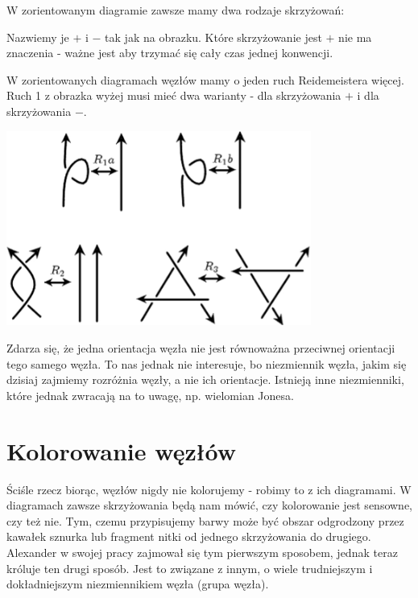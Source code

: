 \documentclass{article}
\begin{document}
W zorientowanym diagramie zawsze mamy dwa rodzaje skrzyżowań:
\begin{center}
\end{center}
Nazwiemy je $+$ i $-$ tak jak na obrazku. Które skrzyżowanie jest $+$ nie ma znaczenia - ważne jest aby trzymać się cały czas jednej konwencji.

W zorientowanych diagramach węzłów mamy o jeden ruch Reidemeistera więcej. Ruch 1 z obrazka wyżej musi mieć dwa warianty - dla skrzyżowania $+$ i dla skrzyżowania $-$.

\begin{center}
  \includegraphics[width=10cm]{oriented_reidemeister.png}
\end{center}

Zdarza się, że jedna orientacja węzła nie jest równoważna przeciwnej orientacji tego samego węzła. To nas jednak nie interesuje, bo niezmiennik węzła, jakim się dzisiaj zajmiemy rozróżnia węzły, a nie ich orientacje. Istnieją inne niezmienniki, które jednak zwracają na to uwagę, np. wielomian Jonesa.

\section{Kolorowanie węzłów}

Ściśle rzecz biorąc, węzłów nigdy nie kolorujemy - robimy to z ich diagramami. W diagramach zawsze skrzyżowania będą nam mówić, czy kolorowanie jest sensowne, czy też nie. Tym, czemu przypisujemy barwy może być obszar odgrodzony przez kawałek sznurka lub fragment nitki od jednego skrzyżowania do drugiego. Alexander w swojej pracy zajmował się tym pierwszym sposobem, jednak teraz króluje ten drugi sposób. Jest to związane z innym, o wiele trudniejszym i dokładniejszym niezmiennikiem węzła (grupa węzła).
\end{document}
